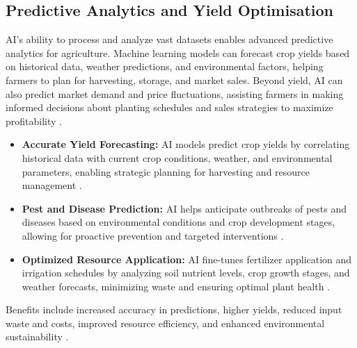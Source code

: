 \subsection{Predictive Analytics and Yield Optimisation}
AI's ability to process and analyze vast datasets enables advanced predictive analytics for agriculture. Machine learning models can forecast crop yields based on historical data, weather predictions, and environmental factors, helping farmers to plan for harvesting, storage, and market sales. Beyond yield, AI can also predict market demand and price fluctuations, assisting farmers in making informed decisions about planting schedules and sales strategies to maximize profitability \cite{kumar2025reviewai}.
\begin{itemize}
    \item \textbf{Accurate Yield Forecasting:} AI models predict crop yields by correlating historical data with current crop conditions, weather, and environmental parameters, enabling strategic planning for harvesting and resource management \cite{Folio3_PredictiveAnalytics, MDPI_PredictiveAnalytics}.
    \item \textbf{Pest and Disease Prediction:} AI helps anticipate outbreaks of pests and diseases based on environmental conditions and crop development stages, allowing for proactive prevention and targeted interventions \cite{Intellias_PredictiveAnalytics}.
    \item \textbf{Optimized Resource Application:} AI fine-tunes fertilizer application and irrigation schedules by analyzing soil nutrient levels, crop growth stages, and weather forecasts, minimizing waste and ensuring optimal plant health \cite{Agmatix_PredictiveAnalytics, Farmonaut_PredictiveAnalytics_3}.
\end{itemize}
Benefits include increased accuracy in predictions, higher yields, reduced input waste and costs, improved resource efficiency, and enhanced environmental sustainability \cite{Xenonstack_PredictiveAnalytics, TheTechNolabs_PredictiveAnalytics}.

